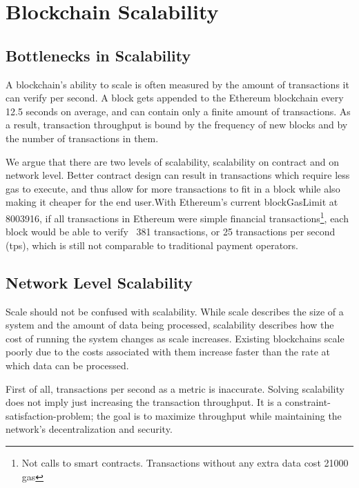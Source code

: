 \chapter{Blockchain Scalability}\label{ch:scalability}

\section{Bottlenecks in Scalability}
A blockchain's ability to scale is often measured by the amount of transactions it can verify per second. A block gets appended to the Ethereum blockchain every 12.5 seconds on average, and can contain only a finite amount of transactions. As a result, transaction throughput is bound by the frequency of new blocks and by the number of transactions in them.

We argue that there are two levels of scalability, scalability on contract and on network level. Better contract design can result in transactions which require less gas to execute, and thus allow for more transactions to fit in a block while also making it cheaper for the end user.With Ethereum's current blockGasLimit at 8003916, if all transactions in Ethereum were simple financial transactions\footnote{Not calls to smart contracts. Transactions without any extra data cost 21000 gas}, each block would be able to verify ~381 transactions, or 25 transactions per second (tps), which is still not comparable to traditional payment operators. 

\section{Network Level Scalability}
Scale should not be confused with scalability. While scale describes the size of a system and the amount of data being processed, scalability describes how the cost of running the system changes as scale increases. Existing blockchains scale poorly due to the costs associated with them increase faster than the rate at which data can be processed. 

First of all, transactions per second as a metric is inaccurate. Solving scalability does not imply just increasing the transaction throughput. It is a constraint-satisfaction-problem; the goal is to maximize throughput while maintaining the network's decentralization and security. 

